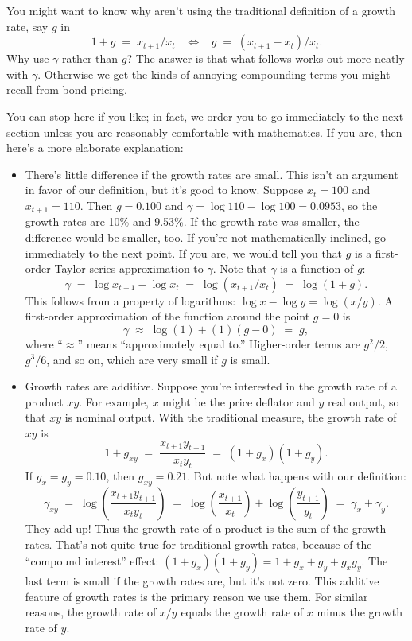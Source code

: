 \documentclass[letterpaper,12pt]{article}
\begin{document}
You might want to know
why aren't using the traditional definition of a growth rate,
say $g$ in
\[
    1 + g \;=\; x_{t+1}/x_t  \;\;\; \Leftrightarrow
                \;\;\; g \;=\; (x_{t+1} - x_t)/x_t .
\]
Why use $\gamma$ rather than $g$?
The answer is that what follows works out more neatly with $\gamma$.
Otherwise we get the kinds of annoying compounding terms you might recall
from bond pricing.

You can stop here if you like; in fact,
we order you to go immediately to the next section
unless you are reasonably comfortable with mathematics.
If you are, then here's a more elaborate explanation:
\begin{itemize}
\item There's little difference if the growth rates are small.
This isn't an argument in favor of our definition, but it's good to know.
Suppose $x_t = 100$ and $x_{t+1} = 110$.  Then $g = 0.100 $ and
$\gamma = \log 110 - \log 100 = 0.0953$,
so the growth rates are 10\% and 9.53\%.
If the growth rate was smaller, the difference would be smaller, too.
If you're not mathematically inclined, go immediately to the next point.
If you are, we would tell you that $g$ is a first-order Taylor series approximation to $\gamma$.
Note that $\gamma$ is a function of $g$:
\[
    \gamma \;=\; \log x_{t+1} - \log x_t \;=\; \log (x_{t+1}/x_t) \;=\; \log (1+g) .
\]
This follows from a property of logarithms:  $\log x - \log y = \log(x/y)$.
A first-order approximation of the function around the point $g=0$ is
\[
    \gamma \;\approx\; \log (1) + (1) (g-0)  \;=\;  g,
\]
where ``$\approx$'' means ``approximately equal to.''
Higher-order terms are $g^2/2$, $g^3/6$, and so on,
which are very small if $g$ is small.

\item Growth rates are additive.
Suppose you're interested in the growth rate of a product $xy$.
For example, $x$ might be the price deflator and $y$ real output, so that $xy$ is nominal output.
With the traditional measure, the growth rate of $xy$ is
\[
    1 + g_{xy} \;=\; \frac{x_{t+1} y_{t+1}}{x_t y_t } \;=\; (1+g_x) (1+g_y).
\]
If $g_x = g_y = 0.10$, then $g_{xy} = 0.21$.
But note what happens with our definition:
\[
    \gamma_{xy} \;=\; \log \left( \frac{x_{t+1} y_{t+1}}{x_t y_t } \right)
                \;=\; \log \left( \frac{x_{t+1}}{x_t} \right) + \log \left( \frac{y_{t+1}}{y_t} \right)
                \;=\; \gamma_x + \gamma_y .
\]
They add up! Thus the growth rate of a product is the sum of the
growth rates. That's not quite true for traditional growth rates,
because of the ``compound interest'' effect:  $ (1+g_x) (1+g_y) =
1 + g_x + g_y + g_x g_y$. The last term is small if the growth
rates are, but it's not zero. This additive feature of growth
rates is the primary reason we use them. For similar reasons, the
growth rate of $x/y$ equals the growth rate of $x$ minus the
growth rate of $y$.



\end{itemize}
\end{document}
